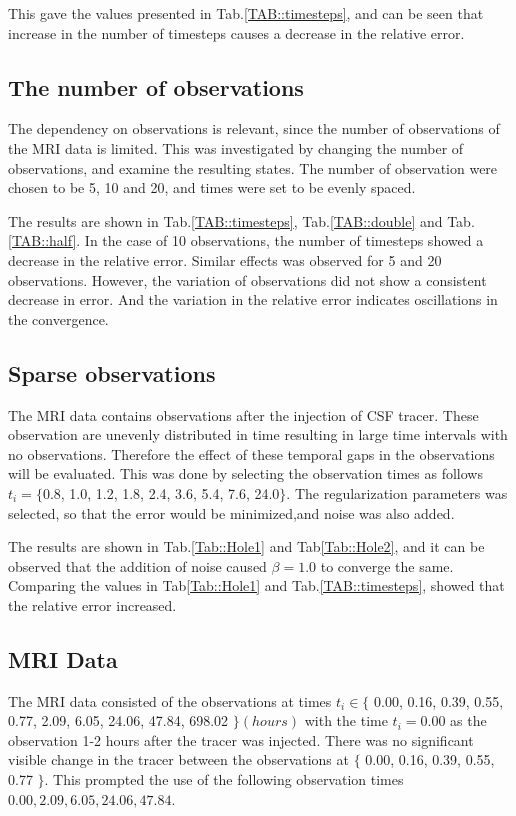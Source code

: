 \documentclass[11pt,a4paper]{article}
\begin{document}
This gave the values presented in Tab.\ref{TAB::timesteps}, and can be seen that increase in the number of timesteps causes a decrease in the relative error. 

\subsection{The number of observations}
The dependency on observations is relevant, since the number of observations of the MRI data is limited. This was investigated by changing the number of observations, and examine the resulting states. The number of observation were chosen to be 5, 10  and 20, and times were set to be evenly spaced. 

The results are shown in Tab.\ref{TAB::timesteps}, Tab.\ref{TAB::double} and Tab.\ref{TAB::half}. In the case of 10 observations, the number of timesteps showed a decrease in the relative error. Similar effects was observed for 5 and 20 observations. However, the variation of observations did not show a consistent decrease in error. And the variation in the relative error indicates oscillations in the convergence. 

\subsection{Sparse observations}
The MRI data contains observations after the injection of CSF tracer. These observation are unevenly distributed in time resulting in large time intervals with no observations. Therefore the effect of these temporal gaps in the observations will be evaluated. This was done by selecting the observation times as follows  $t_i = \lbrace$0.8, 1.0, 1.2, 1.8, 2.4, 3.6, 5.4, 7.6, 24.0$\rbrace$. The regularization parameters was selected, so that the error would be minimized,and noise was also added.

The results are shown in Tab.\ref{Tab::Hole1} and Tab\ref{Tab::Hole2}, and it can be observed that the addition of noise caused $\beta=1.0$ to converge the same. Comparing the values in Tab\ref{Tab::Hole1} and Tab.\ref{TAB::timesteps}, showed that the relative error increased.  

\subsection{MRI Data} 
The MRI data consisted of the observations at times $t_i \in \lbrace$ 0.00, 0.16, 0.39, 0.55, 0.77, 2.09, 6.05, 24.06, 47.84, 698.02 $\rbrace (hours)$ with the time $t_i=0.00$ as the observation 1-2 hours after the tracer was injected. There was no significant visible change in the tracer between the observations at $\lbrace $ 0.00, 0.16, 0.39, 0.55, 0.77 $ \rbrace$. This prompted the use of the following observation times  $0.00, 2.09, 6.05, 24.06, 47.84$. 
\end{document}
